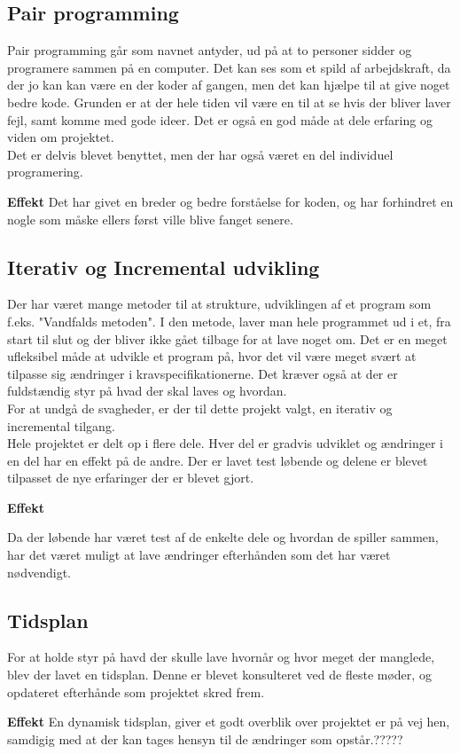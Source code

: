 \subsection{Pair programming}

Pair programming går som navnet antyder, ud på at to personer sidder og programere sammen på en computer. Det kan ses som et spild af arbejdskraft, da der jo kan kan være en der koder af gangen, men det kan hjælpe til at give noget bedre kode. Grunden er at der hele tiden vil være en til at se hvis der bliver laver fejl, samt komme med gode ideer. Det er også en god måde at dele erfaring og viden om projektet.\\

Det er delvis blevet benyttet, men der har også været en del individuel programering.

\textbf {Effekt}
Det har givet en breder og bedre forståelse for koden, og har forhindret en nogle som måske ellers først ville blive fanget senere.



\subsection{Iterativ og Incremental udvikling}
Der har været mange metoder til at strukture, udviklingen af et program som f.eks. "Vandfalds metoden". I den metode, laver man hele programmet ud i et, fra start til slut og der bliver ikke gået tilbage for at lave noget om. Det er en meget ufleksibel måde at udvikle et program på, hvor det vil være meget svært at tilpasse sig ændringer i kravspecifikationerne. Det kræver også at der er fuldstændig styr på hvad der skal laves og hvordan.\\

For at undgå de svagheder, er der til dette projekt valgt, en iterativ og incremental tilgang.\\
Hele projektet er delt op i flere dele. Hver del er gradvis udviklet og ændringer i en del har en effekt på de andre. Der er lavet test løbende og delene er blevet tilpasset de nye erfaringer der er blevet gjort.


\textbf{Effekt}

Da der løbende har været test af de enkelte dele og hvordan de spiller sammen, har det været muligt at lave ændringer efterhånden som det har været nødvendigt.\\


\subsection{Tidsplan}
For at holde styr på havd der skulle lave hvornår og hvor meget der manglede, blev der lavet en tidsplan. Denne er blevet konsulteret ved de fleste møder, og opdateret efterhånde som projektet skred frem.

\textbf{Effekt}
En dynamisk tidsplan, giver et godt overblik over projektet er på vej hen, samdigig med at der kan tages hensyn til de ændringer som opstår.?????


